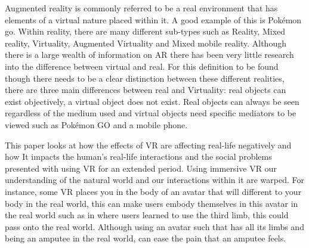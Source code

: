 \documentclass[11pt]{scrartcl}
\begin{document}
Augmented reality is commonly referred to be a real environment that has elements of a virtual nature placed within it. A good example of this is Pokémon go. Within reality, there are many different sub-types such as Reality, Mixed reality, Virtuality, Augmented Virtuality and Mixed mobile reality. Although there is a large wealth of information on AR there has been very little research into the difference between virtual and real. For this definition to be found though there needs to be a clear distinction between these different realities, there are three main differences between real and Virtuality: real objects can exist objectively, a virtual object does not exist. Real objects can always be seen regardless of the medium used and virtual objects need specific mediators to be viewed such as Pokémon GO and a mobile phone. \cite{rosa2016re}

This paper looks at how the effects of VR are affecting real-life negatively and how It impacts the human’s real-life interactions and the social problems presented with using VR for an extended period. Using immersive VR our understanding of the natural world and our interactions within it are warped. For instance, some VR places you in the body of an avatar that will different to your body in the real world, this can make users embody themselves in this avatar in the real world such as in \cite{won2015homuncular} where users learned to use the third limb, this could pass onto the real world. Although using an avatar such that has all its limbs and being an amputee in the real world, can ease the pain that an amputee feels.\cite{madary2016real}
 




\end{document}
